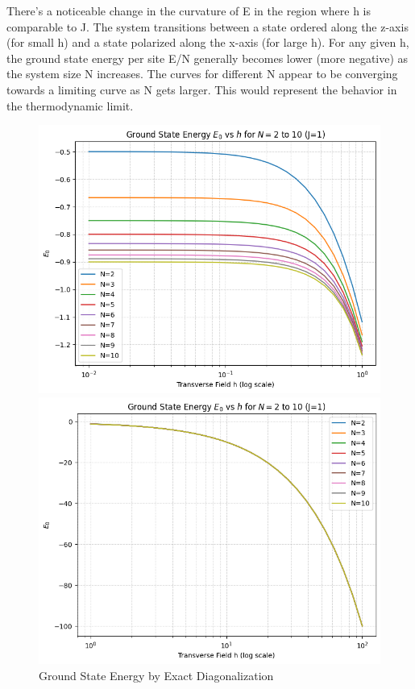 \documentclass[pre,twocolumn,floatfix]{revtex4-1}
\begin{document}
There's a noticeable change in the curvature of E in the region where h is comparable to J. The system transitions between a state ordered along the z-axis (for small h) and a state polarized along the x-axis (for large h). For any given h, the ground state energy per site E/N generally becomes lower (more negative) as the system size N increases. The curves for different N appear to be converging towards a limiting curve as N gets larger. This would represent the behavior in the thermodynamic limit. 
\begin{figure}[htbp]
    \centering
    \begin{minipage}{0.48\textwidth}
        \centering
        \includegraphics[width=\linewidth]{images/E_0_dia.png} %
    \end{minipage}\hfill %
    \begin{minipage}{0.48\textwidth}
        \centering
        \includegraphics[width=\linewidth]{images/E_0_dia_1.png} %
    \end{minipage}
    \caption{Ground State Energy by Exact Diagonalization}
    \label{7}
\end{figure}
\end{document}
